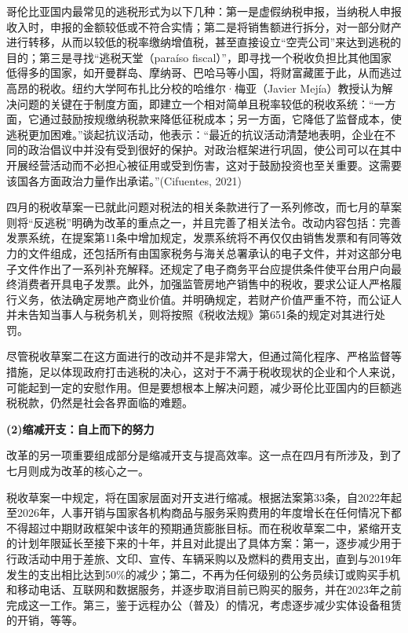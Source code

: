 \documentclass{phyasgn}\usepackage{nag}
\begin{document}
    \par 哥伦比亚国内最常见的逃税形式为以下几种：第一是虚假纳税申报，当纳税人申报收入时，申报的金额较低或不符合实情；第二是将销售额进行拆分，对一部分财产进行转移，从而以较低的税率缴纳增值税，甚至直接设立“空壳公司”来达到逃税的目的；第三是寻找“逃税天堂（paraíso fiscal）”，即寻找一个税收负担比其他国家低得多的国家，如开曼群岛、摩纳哥、巴哈马等小国，将财富藏匿于此，从而逃过高昂的税收。纽约大学阿布扎比分校的哈维尔·梅亚（Javier Mejía）教授认为解决问题的关键在于制度方面，即建立一个相对简单且税率较低的税收系统：“一方面，它通过鼓励按规缴纳税款来降低征税成本；另一方面，它降低了监督成本，使逃税更加困难。”谈起抗议活动，他表示：“最近的抗议活动清楚地表明，企业在不同的政治倡议中并没有受到很好的保护。对政治框架进行巩固，使公司可以在其中开展经营活动而不必担心被征用或受到伤害，这对于鼓励投资也至关重要。这需要该国各方面政治力量作出承诺。”(Cifuentes, 2021)
\par 四月的税收草案一已就此问题对税法的相关条款进行了一系列修改，而七月的草案则将“反逃税”明确为改革的重点之一，并且完善了相关法令。改动内容包括：完善发票系统，在提案第11条中增加规定，发票系统将不再仅仅由销售发票和有同等效力的文件组成，还包括所有由国家税务与海关总署承认的电子文件，并对这部分电子文件作出了一系列补充解释。还规定了电子商务平台应提供条件使平台用户向最终消费者开具电子发票。此外，加强监管房地产销售中的税收，要求公证人严格履行义务，依法确定房地产商业价值。并明确规定，若财产价值严重不符，而公证人并未告知当事人与税务机关，则将按照《税收法规》第651条的规定对其进行处罚。
\par 尽管税收草案二在这方面进行的改动并不是非常大，但通过简化程序、严格监督等措施，足以体现政府打击逃税的决心，这对于不满于税收现状的企业和个人来说，可能起到一定的安慰作用。但是要想根本上解决问题，减少哥伦比亚国内的巨额逃税税款，仍然是社会各界面临的难题。
\par \textbf{(2)缩减开支：自上而下的努力}
\par 改革的另一项重要组成部分是缩减开支与提高效率。这一点在四月有所涉及，到了七月则成为改革的核心之一。
\par 税收草案一中规定，将在国家层面对开支进行缩减。根据法案第33条，自2022年起至2026年，人事开销与国家各机构商品与服务采购费用的年度增长在任何情况下都不得超过中期财政框架中该年的预期通货膨胀目标。而在税收草案二中，紧缩开支的计划年限延长至接下来的十年，并且对此提出了具体方案：第一，逐步减少用于行政活动中用于差旅、文印、宣传、车辆采购以及燃料的费用支出，直到与2019年发生的支出相比达到50\%的减少；第二，不再为任何级别的公务员续订或购买手机和移动电话、互联网和数据服务，并逐步取消目前已购买的服务，并在2023年之前完成这一工作。第三，鉴于远程办公（普及）的情况，考虑逐步减少实体设备租赁的开销，等等。
\end{document}
